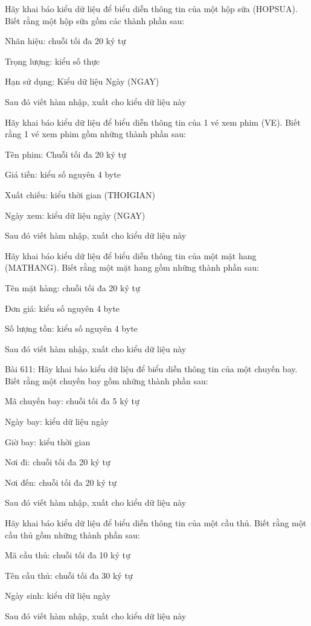 \begin{problem}
    Hãy khai báo kiểu dữ liệu để biểu diễn thông tin của một hộp sữa (HOPSUA). Biết rằng một hộp sữa gồm các thành phần sau:

Nhãn hiệu: chuỗi tối đa 20 ký tự

Trọng lượng: kiểu số thực

Hạn sử dụng: Kiểu dữ liệu Ngày (NGAY)

Sau đó viết hàm nhập, xuất cho kiểu dữ liệu này
\end{problem}
\begin{problem}
    Hãy khai báo kiểu dữ liệu để biểu diễn thông tin của 1 vé xem phim (VE). Biết rằng 1 vé xem phim gồm những thành phần sau:

Tên phim: Chuỗi tối đa 20 ký tự

Giá tiền: kiểu số nguyên 4 byte

Xuất chiếu: kiểu thời gian (THOIGIAN)

Ngày xem: kiểu dữ liệu ngày (NGAY)

Sau đó viết hàm nhập, xuất cho kiểu dữ liệu này
\end{problem}
\begin{problem}
    Hãy khai báo kiểu dữ liệu để biểu diễn thông tin của một mặt hang (MATHANG). Biết rằng một mặt hang gồm những thành phần sau:

Tên mặt hàng: chuỗi tối đa 20 ký tự

Đơn giá: kiểu số nguyên 4 byte

Số lượng tồn: kiểu số nguyên 4 byte

Sau đó viết hàm nhập, xuất cho kiểu dữ liệu này

\end{problem}
\begin{problem}
    
Bài 611: Hãy khai báo kiểu dữ liệu để biểu diễn thông tin của một chuyến bay. Biết rằng một chuyến bay gồm những thành phần sau:

Mã chuyến bay: chuỗi tối đa 5 ký tự

Ngày bay: kiểu dữ liệu ngày

Giờ bay: kiểu thời gian

Nơi đi: chuỗi tối đa 20 ký tự

Nơi đến: chuỗi tối đa 20 ký tự

Sau đó viết hàm nhập, xuất cho kiểu dữ liệu này
\end{problem}
\begin{problem}
    Hãy khai báo kiểu dữ liệu để biểu diễn thông tin của một cầu thủ. Biết rằng một cầu thủ gồm những thành phần sau:

Mã cầu thủ: chuỗi tối đa 10 ký tự

Tên cầu thủ: chuỗi tối đa 30 ký tự

Ngày sinh: kiểu dữ liệu ngày

Sau đó viết hàm nhập, xuất cho kiểu dữ liệu này
\end{problem}
